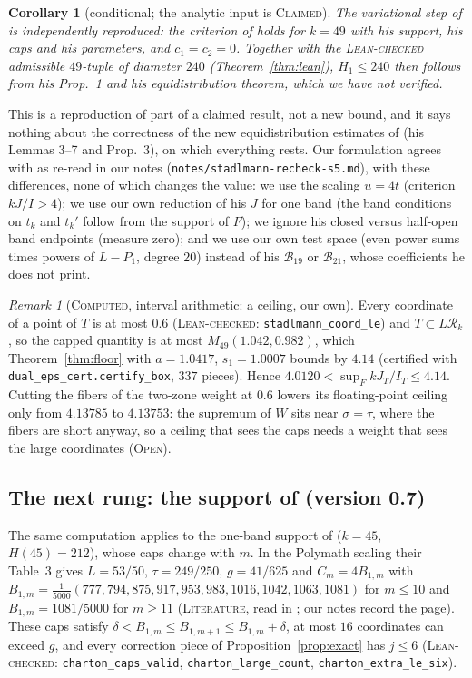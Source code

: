 \documentclass[11pt]{amsart}
\newtheorem{corollary}[theorem]{Corollary}
\theoremstyle{definition}
\theoremstyle{remark}
\newtheorem{remark}[theorem]{Remark}
\newcommand{\lbl}[1]{\textup{\textsc{#1}}}
\newcommand{\R}{\mathcal{R}}
\begin{document}
\begin{corollary}[conditional; the analytic input is \lbl{Claimed}]\label{cor:240}
The variational step of \cite{Sta26} is independently reproduced: the
criterion of \cite[Prop.~1]{Sta26} holds for $k=49$ with his support, his
caps and his parameters, and $c_1=c_2=0$. Together with the
\lbl{Lean-checked} admissible $49$-tuple of diameter $240$
(Theorem~\ref{thm:lean}), $H_1\le240$ then follows from his Prop.~1 and his
equidistribution theorem, which we have not verified.
\end{corollary}

This is a reproduction of part of a claimed result, not a new bound, and it
says nothing about the correctness of the new equidistribution estimates of
\cite{Sta26} (his Lemmas 3--7 and Prop.~3), on which everything rests. Our
formulation agrees with \cite{Sta26} as re-read in our notes
(\texttt{notes/stadlmann-\allowbreak recheck-s5.md}), with these differences, none of which
changes the value: we use the scaling $u=4t$ (criterion $kJ/I>4$); we use our
own reduction of his $J$ for one band (the band conditions on $t_k$ and
$t_k'$ follow from the support of $F$); we ignore his closed versus half-open
band endpoints (measure zero); and we use our own test space (even power sums
times powers of $L-P_1$, degree $20$) instead of his $\mathcal B_{19}$ or
$\mathcal B_{21}$, whose coefficients he does not print.

\begin{remark}[\lbl{Computed}, interval arithmetic: a ceiling, our own]\label{rem:ceiling}
Every coordinate of a point of $T$ is at most $0.6$
(\lbl{Lean-checked}: \texttt{stadlmann\_coord\_le}) and $T\subset L\R_k$, so
the capped quantity is at most $M_{49}(1.042,0.982)$, which
Theorem~\ref{thm:floor} with $a=1.0417$, $s_1=1.0007$ bounds by $4.14$
(certified with \texttt{dual\_eps\_cert.certify\_box}, $337$ pieces). Hence
$4.0120<\sup_F kJ_T/I_T\le4.14$. Cutting the fibers of the two-zone weight at
$0.6$ lowers its floating-point ceiling only from $4.13785$ to $4.13753$: the
supremum of $W$ sits near $\sigma=\tau$, where the fibers are short anyway,
so a ceiling that sees the caps needs a weight that sees the large
coordinates (\lbl{Open}).
\end{remark}

\subsection*{The next rung: the support of \texorpdfstring{\cite{Cha26}}{Charton et al.} (version 0.7)}
The same computation applies to the one-band support of \cite{Cha26}
($k=45$, $H(45)=212$), whose caps change with $m$. In the Polymath scaling
their Table~3 gives $L=53/50$, $\tau=249/250$, $g=41/625$ and
$C_m=4B_{1,m}$ with
$B_{1,m}=\frac{1}{5000}(777,794,875,917,953,983,1016,1042,1063,1081)$ for
$m\le10$ and $B_{1,m}=1081/5000$ for $m\ge11$ (\lbl{Literature}, read in
\cite{Cha26}; our notes record the page). These caps satisfy
$\delta<B_{1,m}\le B_{1,m+1}\le B_{1,m}+\delta$, at most $16$ coordinates can
exceed $g$, and every correction piece of Proposition~\ref{prop:exact} has
$j\le6$ (\lbl{Lean-checked}: \texttt{charton\_caps\_valid},
\texttt{charton\_large\_count}, \texttt{charton\_extra\_le\_six}).
\end{document}

